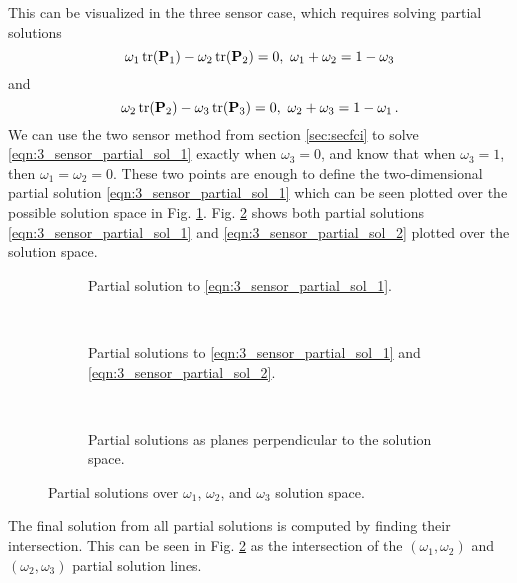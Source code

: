 \documentclass[letterpaper, 10 pt, conference]{ieeeconf}  %
\begin{document}
This can be visualized in the three sensor case, which requires solving partial solutions
\begin{equation}
   \omega_1 \operatorname{tr}({{\mathbf{P}}}_1) - \omega_2 \operatorname{tr}({{\mathbf{P}}}_2) = 0,\ \omega_1+\omega_2=1-\omega_3 \label{eqn:3_sensor_partial_sol_1}
\end{equation}
and
\begin{equation}
   \omega_2 \tr(\mP_2) - \omega_3 \tr(\mP_3) = 0,\ \omega_2+\omega_3=1-\omega_1\,. \label{eqn:3_sensor_partial_sol_2}
\end{equation}
We can use the two sensor method from section \ref{sec:secfci} to solve \eqref{eqn:3_sensor_partial_sol_1} exactly when $\omega_3=0$, and know that when $\omega_3=1$, then $\omega_1=\omega_2=0$. These two points are enough to define the two-dimensional partial solution \eqref{eqn:3_sensor_partial_sol_1} which can be seen plotted over the possible solution space in Fig. \ref{fig:3_sensor_partial_sol}. Fig. \ref{fig:3_sensor_partial_sols} shows both partial solutions \eqref{eqn:3_sensor_partial_sol_1} and \eqref{eqn:3_sensor_partial_sol_2} plotted over the solution space.
\begin{figure*}[tb]
   \begin{subfigure}[t]{0.3\textwidth}
      \begin{center}
         
      \end{center}
      \caption{Partial solution to \eqref{eqn:3_sensor_partial_sol_1}.}
      \label{fig:3_sensor_partial_sol}
   \end{subfigure}
   ~
   \begin{subfigure}[t]{0.3\textwidth}
      \begin{center}
         
      \end{center}
      \caption{Partial solutions to \eqref{eqn:3_sensor_partial_sol_1} and \eqref{eqn:3_sensor_partial_sol_2}.}
      \label{fig:3_sensor_partial_sols}
   \end{subfigure}
   ~
   \begin{subfigure}[t]{0.3\textwidth}
      \begin{center}
         
      \end{center}
      \caption{Partial solutions as planes perpendicular to the solution space.}
      \label{fig:3sen_planes}
   \end{subfigure}
   \caption{Partial solutions over $\omega_1$, $\omega_2$, and $\omega_3$ solution space.}
   \vspace{-\baselineskip}
   \label{fig:partial_sols_and_planes}
\end{figure*}
The final solution from all partial solutions is computed by finding their intersection. This can be seen in Fig. \ref{fig:3_sensor_partial_sols} as the intersection of the $(\omega_1,\omega_2)$ and $(\omega_2,\omega_3)$ partial solution lines.
\end{document}
